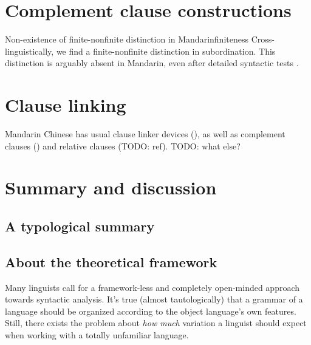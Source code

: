 \documentclass[UTF8, a4paper, oneside, scheme=plain, 12pt]{ctexrep}
\begin{document}
\chapter{Complement clause constructions}\label{sec:complement-clause}


\begin{infobox}{Non-existence of finite-nonfinite distinction in Mandarin}{finiteness}
    Cross-linguistically, we find a finite-nonfinite distinction in subordination.
    This distinction is arguably absent in Mandarin,
    even after detailed syntactic tests \citep{no-finite}.
\end{infobox}

\chapter{Clause linking}\label{chap:clause-linking}

Mandarin Chinese has usual clause linker devices (),
as well as complement clauses ()
and relative clauses (TODO: ref). TODO: what else?

\chapter{Summary and discussion}

\section{A typological summary}

\section{About the theoretical framework}

Many linguists call for a framework-less and completely open-minded approach towards syntactic analysis.
It's true (almost tautologically) that a grammar of a language 
should be organized according to the object language's 
own features.
Still, there exists the problem about \emph{how much} variation 
a linguist should expect when working with a totally unfamiliar language.
\end{document}
